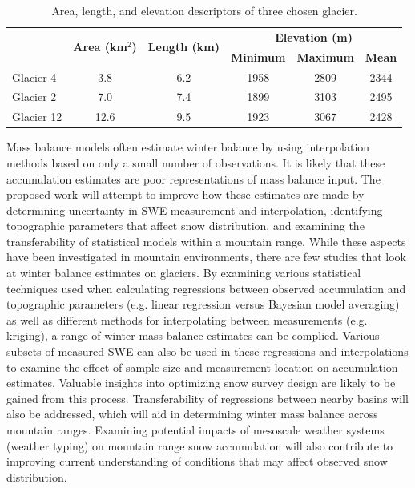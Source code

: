 \documentclass{sfuthesis}
\begin{document}
\begin{table}[b]
\centering
\caption{Area, length, and elevation descriptors of three chosen glacier.}
\label{tab:glacierstats}
\begin{tabular}{|l|c|c|ccc|}
\hline
\multicolumn{1}{|c|}{} & \multirow{2}{*}{\textbf{Area (km$^2$)}} & \multirow{2}{*}{\textbf{Length (km)}} & \multicolumn{3}{c|}{\textbf{Elevation (m)}}         \\
\multicolumn{1}{|c|}{} &                                         &                                       & \textbf{Minimum} & \textbf{Maximum} & \textbf{Mean} \\ \hline
Glacier 4              & 3.8                                    & 6.2                                   & 1958             & 2809             & 2344          \\
Glacier 2              & 7.0                                    & 7.4                                   & 1899 & 3103             & 2495          \\
Glacier 12             & 12.6                                   & 9.5                                   & 1923 & 3067             & 2428          \\ \hline
\end{tabular}
\end{table} 

Mass balance models often estimate winter balance by using interpolation methods based on only a small number of observations. It is likely that these accumulation estimates are poor representations of mass balance input. The proposed work will attempt to improve how these estimates are made by determining uncertainty in SWE measurement and interpolation, identifying topographic parameters that affect snow distribution, and examining the transferability of statistical models within a mountain range. While these aspects have been investigated in mountain environments, there are few studies that look at winter balance estimates on glaciers. By examining various statistical techniques used when calculating regressions between observed accumulation and topographic parameters (e.g. linear regression versus Bayesian model averaging) as well as different methods for interpolating between measurements (e.g. kriging), a range of winter mass balance estimates can be complied. Various subsets of measured SWE can also be used in these regressions and interpolations to examine the effect of sample size and measurement location on accumulation estimates. Valuable insights into optimizing snow survey design are likely to be gained from this process. Transferability of regressions between nearby basins will also be addressed, which will aid in determining winter mass balance across mountain ranges. Examining potential impacts of mesoscale weather systems (weather typing) on mountain range snow accumulation will also contribute to improving current understanding of conditions that may affect observed snow distribution. 
\end{document}
